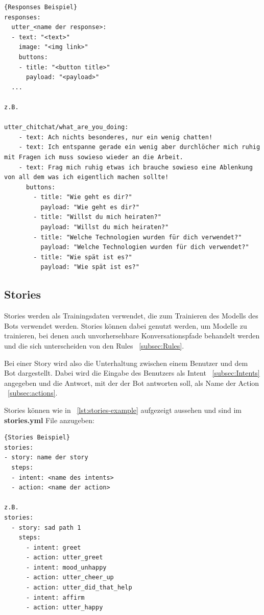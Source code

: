 \begin{lstlisting}[label={lst:responses-example},caption={Responses Beispiel}]{Responses Beispiel}
responses:
  utter_<name der response>:
  - text: "<text>"
    image: "<img link>"
    buttons:
    - title: "<button title>"
      payload: "<payload>"
  ...

z.B.

utter_chitchat/what_are_you_doing:
    - text: Ach nichts besonderes, nur ein wenig chatten!
    - text: Ich entspanne gerade ein wenig aber durchlöcher mich ruhig mit Fragen ich muss sowieso wieder an die Arbeit.
    - text: Frag mich ruhig etwas ich brauche sowieso eine Ablenkung von all dem was ich eigentlich machen sollte!
      buttons:
        - title: "Wie geht es dir?"
          payload: "Wie geht es dir?"
        - title: "Willst du mich heiraten?"
          payload: "Willst du mich heiraten?"
        - title: "Welche Technologien wurden für dich verwendet?"
          payload: "Welche Technologien wurden für dich verwendet?"
        - title: "Wie spät ist es?"
          payload: "Wie spät ist es?"
\end{lstlisting}

\subsection{Stories}\label{subsec:Stories}

Stories werden als Trainingsdaten verwendet, die zum Trainieren des Modells des Bots verwendet werden.
Stories können dabei genutzt werden, um Modelle zu trainieren, bei denen auch unvorhersehbare Konversationspfade behandelt werden und die sich unterscheiden von den Rules ~\ref{subsec:Rules}.\cite{stories}

Bei einer Story wird also die Unterhaltung zwischen einem Benutzer und dem Bot dargestellt.
Dabei wird die Eingabe des Benutzers als Intent ~\ref{subsec:Intents} angegeben und die Antwort, mit der der Bot antworten soll, als Name der Action ~\ref{subsec:actions}.\cite{stories}

Stories können wie in ~\ref{lst:stories-example} aufgezeigt aussehen und sind im \textbf{stories.yml} File anzugeben:

\begin{lstlisting}[label={lst:stories-example},caption={Stories Beispiel}]{Stories Beispiel}
stories:
- story: name der story
  steps:
  - intent: <name des intents>
  - action: <name der action>

z.B.
stories:
  - story: sad path 1
    steps:
      - intent: greet
      - action: utter_greet
      - intent: mood_unhappy
      - action: utter_cheer_up
      - action: utter_did_that_help
      - intent: affirm
      - action: utter_happy
\end{lstlisting}

